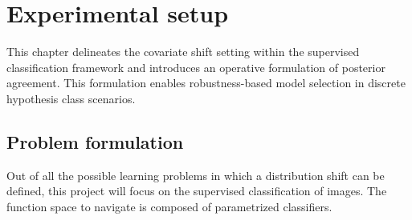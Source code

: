 \chapter{Experimental setup}\label{sec:experimental_setup}

This chapter delineates the covariate shift setting within the 
supervised classification framework and introduces an operative
formulation of posterior agreement. This formulation enables
robustness-based model selection in discrete hypothesis class scenarios.


\section{Problem formulation}

Out of all the possible learning problems in which a distribution shift
can be defined, this project will focus on the supervised classification
of images. The function space to navigate is composed of parametrized
classifiers.

